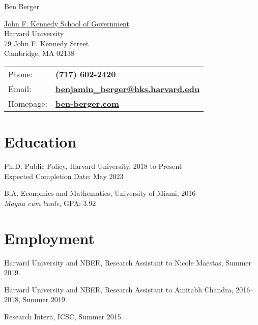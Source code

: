 \documentclass[letterpaper]{article}
\def\name{Ben Berger}
\renewenvironment{itemize}{
  \begin{list}{}{
    \setlength{\leftmargin}{1.5em}
  }
}{
  \end{list}
}
\begin{document}
{\huge \name}


\vspace{0.25in}

\begin{minipage}{0.45\linewidth}
  \href{http://www.hks.harvard.edu/}{John F. Kennedy School of Government} \\
  Harvard University \\
  79 John F. Kennedy Street \\
  Cambridge, MA 02138
\end{minipage}
\begin{minipage}{0.45\linewidth}
  \begin{tabular}{ll}
    Phone: & \bf (717) 602-2420 \\
    Email: & \href{mailto:benjamin\_berger@hks.harvard.edu}{\bf benjamin\_berger@hks.harvard.edu} \\
    Homepage: & \href{http://ben-berger.com/}{\bf ben-berger.com} \\
  \end{tabular}
\end{minipage}



\section*{Education}

\begin{itemize}
  \item Ph.D. Public Policy, Harvard University, 2018 to Present \\
  Expected Completion Date: May 2023

  \item B.A. Economics and Mathematics, University of Miami, 2016 \\
  \textit{Magna cum laude},  GPA: 3.92
\end{itemize}


\section*{Employment}

\begin{itemize}
\item Harvard University and NBER, Research Assistant to Nicole Maestas, Summer 2019.
\item Harvard University and NBER, Research Assistant to Amitabh Chandra, 2016--2018, Summer 2019.
\item Research Intern, ICSC, Summer 2015.
\end{itemize}
\end{document}

